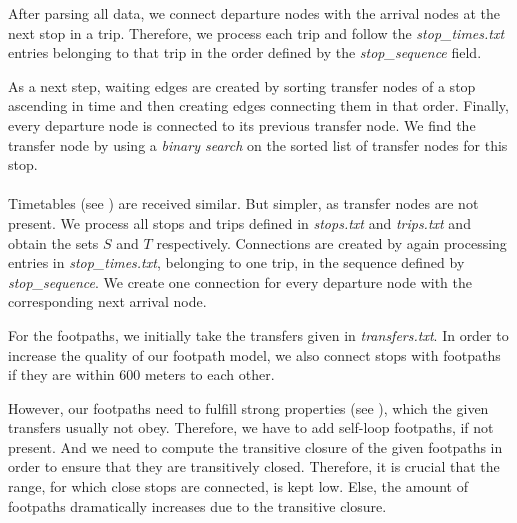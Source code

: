 	After parsing all data, we connect departure nodes with the arrival nodes at the next stop in a trip. Therefore, we
	process each trip and follow the \textit{stop\_times.txt} entries belonging to that trip in the order defined by
	the \textit{stop\_sequence} field.
	
	As a next step, waiting edges are created by sorting transfer nodes of a stop ascending in time and then creating edges
	connecting them in that order. Finally, every departure node is connected to its previous transfer node. We find the
	transfer node by using a \textit{binary search}  on the sorted list of transfer nodes for this stop.\\\\
	Timetables (see ) are received similar. But simpler, as transfer nodes are not present. We process
	all stops and trips defined in \textit{stops.txt} and \textit{trips.txt} and obtain the sets $S$ and $T$ respectively.
	Connections are created by again processing entries in \textit{stop\_times.txt}, belonging to one trip, in the sequence
	defined by \textit{stop\_sequence}. We create one connection for every departure node with the corresponding
	next arrival node.
	
	For the footpaths, we initially take the transfers given in \textit{transfers.txt}. In order to increase the quality
	of our footpath model, we also connect stops with footpaths if they are within $600$ meters to each other.
	
	However, our footpaths need to fulfill strong properties (see ), which the given
	transfers usually not obey. Therefore, we have to add self-loop footpaths, if not present. And we need to compute
	the transitive closure of the given footpaths in order to ensure that they are transitively closed. Therefore, it is
	crucial that the range, for which close stops are connected, is kept low. Else, the amount of footpaths dramatically increases
	due to the transitive closure.
	
